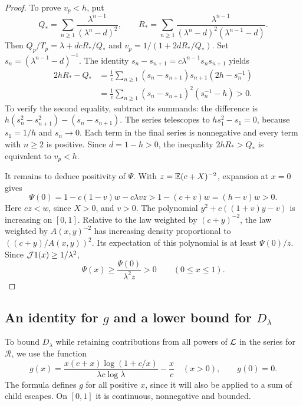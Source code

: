 \begin{proof}
To prove $v_p<h$, put
\[
 Q_* =\sum_{n\ge1}\frac{\lambda^{n-1}}{(\lambda^n-d)^2},\qquad
 R_* =\sum_{n\ge1}
 \frac{\lambda^{n-1}}{(\lambda^n-d)^2(\lambda^{n-1}-d)}.
\]
Then $Q_p/T_p=\lambda+dcR_*/Q_*$ and $v_p=1/(1+2dR_*/Q_*)$. Set $s_n=(\lambda^{n-1}-d)^{-1}$. The identity
$s_n-s_{n+1}=c\lambda^{n-1}s_ns_{n+1}$ yields
\begin{align*}
 2hR_*-Q_*
 &=\frac1c\sum_{n\ge1}(s_n-s_{n+1})s_{n+1}(2h-s_n^{-1})\\
 &=\frac1c\sum_{n\ge1}(s_n-s_{n+1})^2(s_n^{-1}-h)>0.
\end{align*}
To verify the second equality, subtract its summands: the difference is
$h(s_n^2-s_{n+1}^2)-(s_n-s_{n+1})$. The series telescopes to $hs_1^2-s_1=0$, because $s_1=1/h$ and $s_n\to0$. Each term in the final series is nonnegative and every term with $n\ge2$ is positive. Since $d=1-h>0$, the inequality $2hR_*>Q_*$ is equivalent to $v_p<h$.

It remains to deduce positivity of $\Psi$. With $z=\mathbb E(c+X)^{-2}$, expansion at $x=0$ gives
\begin{equation}\label{eq:Psi-zero-positive}
 \Psi(0)=1-c(1-v)w-c\lambda vz
 >1-(c+v)w=(h-v)w>0.
\end{equation}
Here $cz<w$, since $X>0$, and $v>0$. The polynomial $y^2+c((1+v)y-v)$ is increasing on $[0,1]$. Relative to the law weighted by $(c+y)^{-2}$, the law weighted by $A(x,y)^{-2}$ has increasing density proportional to $((c+y)/A(x,y))^2$. Its expectation of this polynomial is at least $\Psi(0)/z$. Since $\mathcal J1(x)\ge1/\lambda^2$,
\[
 \Psi(x)\ge\frac{\Psi(0)}{\lambda^2z}>0\qquad(0\le x\le1).
\]
\end{proof}

\subsection{An identity for \texorpdfstring{$g$}{g} and a lower bound for \texorpdfstring{$D_\lambda$}{D(lambda)}}
To bound $D_\lambda$ while retaining contributions from all powers of $\mathcal L$ in the series for $\mathcal R$, we use the function
\begin{equation}\label{eq:entropy-function}
 g(x)=\frac{x(c+x)\log(1+c/x)}{\lambda c\log\lambda}-\frac{x}{c}
 \quad(x>0),\qquad g(0)=0.
\end{equation}
The formula defines $g$ for all positive $x$, since it will also be applied to a sum of child escapes. On $[0,1]$ it is continuous, nonnegative and bounded.

